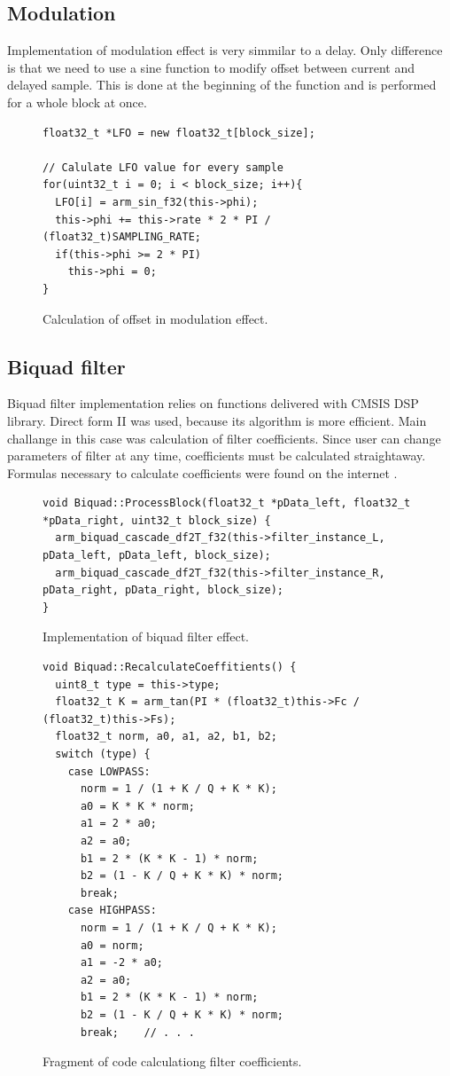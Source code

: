 \documentclass[a4paper,twoside,12pt]{book}
\begin{document}
\subsection{Modulation}
Implementation of modulation effect is very simmilar to a delay.
Only difference is that we need to use a sine function
to modify offset between current and delayed sample.
This is done at the beginning of the function
and is performed for a whole block at once.

\begin{figure}[H]
\centering
\begin{lstlisting}
float32_t *LFO = new float32_t[block_size];

// Calulate LFO value for every sample
for(uint32_t i = 0; i < block_size; i++){
  LFO[i] = arm_sin_f32(this->phi);
  this->phi += this->rate * 2 * PI / (float32_t)SAMPLING_RATE;
  if(this->phi >= 2 * PI)
    this->phi = 0;
}
\end{lstlisting}
\caption{Calculation of offset in modulation effect.}
\label{fig:modul}
\end{figure}

\subsection{Biquad filter}
Biquad filter implementation relies on functions
delivered with CMSIS DSP library.
Direct form II was used, because its algorithm is more efficient.
Main challange in this case was calculation of filter coefficients.
Since user can change parameters of filter at any time,
coefficients must be calculated straightaway.
Formulas necessary to calculate coefficients were found on the internet
\cite{biquad_web}.

\begin{figure}[H]
\centering
\begin{lstlisting}
void Biquad::ProcessBlock(float32_t *pData_left, float32_t *pData_right, uint32_t block_size) {
  arm_biquad_cascade_df2T_f32(this->filter_instance_L, pData_left, pData_left, block_size);
  arm_biquad_cascade_df2T_f32(this->filter_instance_R, pData_right, pData_right, block_size);
}
\end{lstlisting}
\caption{Implementation of biquad filter effect.}
\label{fig:Biq}
\end{figure}

\begin{figure}[H]
\centering
\begin{lstlisting}
void Biquad::RecalculateCoeffitients() {
  uint8_t type = this->type;
  float32_t K = arm_tan(PI * (float32_t)this->Fc / (float32_t)this->Fs);
  float32_t norm, a0, a1, a2, b1, b2;
  switch (type) {
    case LOWPASS:
      norm = 1 / (1 + K / Q + K * K);
      a0 = K * K * norm;
      a1 = 2 * a0;
      a2 = a0;
      b1 = 2 * (K * K - 1) * norm;
      b2 = (1 - K / Q + K * K) * norm;
      break;
    case HIGHPASS:
      norm = 1 / (1 + K / Q + K * K);
      a0 = norm;
      a1 = -2 * a0;
      a2 = a0;
      b1 = 2 * (K * K - 1) * norm;
      b2 = (1 - K / Q + K * K) * norm;
      break;    // . . .
\end{lstlisting}
\caption{Fragment of code calculationg filter coefficients\cite{biquad_web}.}
\label{fig:Biq2}
\end{figure}
\end{document}
